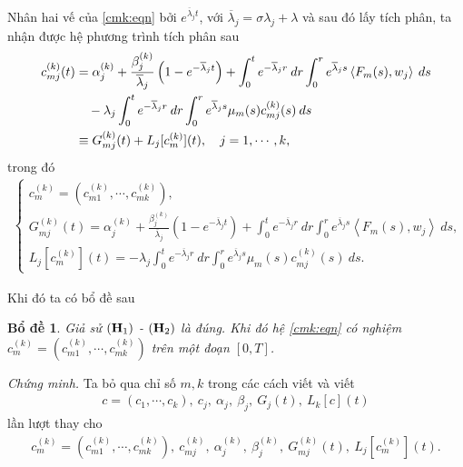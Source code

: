 \documentclass[12pt,a4paper]{article}
\newtheorem{lemma}[theorem]{Bổ đề}[section]
\theoremstyle{definition}
\theoremstyle{definition}
\begin{document}
Nhân hai vế của \eqref{cmk:eqn} bởi $e^{\overline{\lambda}_j t}$, với $\overline{\lambda}_j = \sigma \lambda_j + \lambda$ và sau đó lấy tích phân, ta nhận được hệ phương trình tích phân sau
\begin{align} \label{cmk:solution}
    c_{mj}^{(k)}(t) &=
    \alpha_j^{(k)} + \frac{\beta_j^{(k)}}{\overline{\lambda}_j}\left(1 - e^{-\overline{\lambda}_j t}\right)
    + \int_0^t e^{-\overline{\lambda}_j r} \: dr \int_0^r e^{\overline{\lambda}_j s} \left<F_m(s), w_j\right>\: ds \\
    &\quad - \lambda_j \int_0^t e^{-\overline{\lambda}_j r} \: dr \int_0^r e^{\overline{\lambda}_j s} \mu_m(s) c_{mj}^{(k)}(s)\:ds \notag \\
    &\equiv G_{mj}^{(k)}(t) + L_j[c_{m}^{(k)}](t), \quad j = 1,\cdots,k, \notag
\end{align}
trong đó
\begin{align} \label{cmk:coeff}
\begin{cases}
    c_m^{(k)} = (c_{m1}^{(k)}, \cdots, c_{mk}^{(k)}), \\
    \displaystyle G_{mj}^{(k)}(t) = \alpha_j^{(k)} + \frac{\beta_j^{(k)}}{\overline{\lambda}_j}\left(1 - e^{-\overline{\lambda}_j t}\right) + \int_0^t e^{-\overline{\lambda}_j r} \: dr \int_0^r e^{\overline{\lambda}_j s} \left<F_m(s), w_j\right>\: ds, \\
    \displaystyle L_j[c_{m}^{(k)}](t) = - \lambda_j \int_0^t e^{-\overline{\lambda}_j r} \: dr \int_0^r e^{\overline{\lambda}_j s} \mu_m(s) c_{mj}^{(k)}(s)\:ds.
\end{cases}
\end{align}

Khi đó ta có bổ đề sau

\begin{lemma} \label{lemma32}
    Giả sử $({\bf H}_1)$ - $({\bf H}_2)$ là đúng. Khi đó hệ \eqref{cmk:eqn} có nghiệm $c_m^{(k)} = (c_{m1}^{(k)}, \cdots, c_{mk}^{(k)})$ trên một đoạn $[0,T]$.
\end{lemma}

\textit{Chứng minh.} Ta bỏ qua chỉ số $m, k$ trong các cách viết và viết
\begin{align*}
    c = (c_1,\cdots,c_k), \  c_j, \  \alpha_j, \  \beta_j, \  G_j(t), \  L_k[c](t)
\end{align*}
lần lượt thay cho
\begin{align*}
    c_m^{(k)} = (c_{m1}^{(k)}, \cdots, c_{mk}^{(k)}), \ 
    c_{mj}^{(k)}, \ 
    \alpha_j^{(k)}, \ 
    \beta_j^{(k)}, \ 
    G_{mj}^{(k)}(t), \ 
    L_j[c_m^{(k)}](t).
\end{align*}
\end{document}
